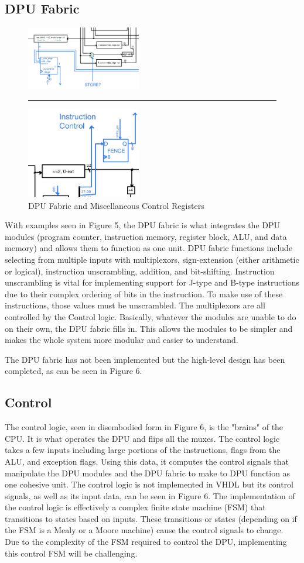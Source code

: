 \documentclass[lettersize,journal]{IEEEtran}
\begin{document}
\subsection{DPU Fabric}
\begin{figure}[!h]
  \label{fig:dpumisc}
  \centering
  \includegraphics[width=5cm]{Misc1.jpg}
  \rule{7cm}{0.8pt}
  \includegraphics[width=5cm]{Misc2.jpg}
  \caption{DPU Fabric and Miscellaneous Control Registers}
\end{figure}
With examples seen in Figure 5, the DPU fabric is what integrates the DPU modules (program counter, instruction memory, register block, ALU, and data memory) and allows them to function as one unit.
DPU fabric functions include selecting from multiple inputs with multiplexors, sign-extension (either arithmetic or logical), instruction unscrambling, addition, and bit-shifting.
Instruction unscrambling is vital for implementing support for J-type and B-type instructions due to their complex ordering of bits in the instruction.
To make use of these instructions, those values must be unscrambled.
The multiplexors are all controlled by the Control logic.
Basically, whatever the modules are unable to do on their own, the DPU fabric fills in.
This allows the modules to be simpler and makes the whole system more modular and easier to understand.

The DPU fabric has not been implemented but the high-level design has been completed, as can be seen in Figure 6.

\subsection{Control}
The control logic, seen in disembodied form in Figure 6, is the "brains" of the CPU.
It is what operates the DPU and flips all the muxes.
The control logic takes a few inputs including large portions of the instructions, flags from the ALU, and exception flags.
Using this data, it computes the control signals that manipulate the DPU modules and the DPU fabric to make to DPU function as one cohesive unit.
The control logic is not implemented in VHDL but its control signals, as well as its input data, can be seen in Figure 6.
The implementation of the control logic is effectively a complex finite state machine (FSM) that transitions to states based on inputs.
These transitions or states (depending on if the FSM is a Mealy or a Moore machine) cause the control signals to change.
Due to the complexity of the FSM required to control the DPU, implementing this control FSM will be challenging.
\end{document}
